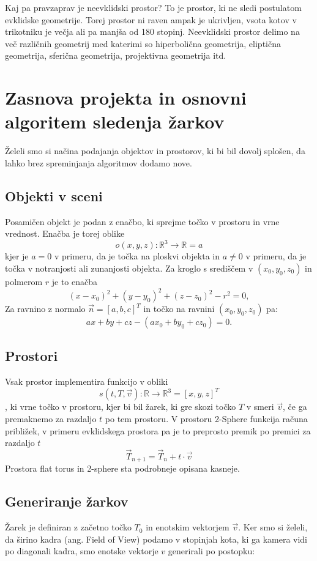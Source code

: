 \documentclass[titlepage]{article}
\begin{document}
Kaj pa pravzaprav je neevklidski prostor? To je prostor, ki ne sledi postulatom evklidske geometrije. 
Torej prostor ni raven ampak je ukrivljen, vsota kotov v trikotniku je večja ali pa manjša od 
180 stopinj. Neevklidski prostor delimo na več različnih geometrij med katerimi so 
hiperbolična geometrija, eliptična geometrija, sferična geometrija, projektivna geometrija itd.

\section{Zasnova projekta in osnovni algoritem sledenja žarkov}
Želeli smo si načina podajanja objektov in prostorov, ki bi bil dovolj splošen, da lahko brez
spreminjanja algoritmov dodamo nove.

\subsection{Objekti v sceni}
Posamičen objekt je podan z enačbo, ki sprejme točko v prostoru in vrne vrednost. 
Enačba je torej oblike
\[ o(x,y,z): \mathbb{R}^3 \to \mathbb{R} = a \]
kjer je \(a = 0\) v primeru, da je točka na ploskvi objekta in \( a \neq 0 \) v primeru, da 
je točka v notranjosti ali zunanjosti objekta.
Za kroglo s središčem v $(x_{0}, y_{0}, z_{0})$ in polmerom $r$ je to enačba
\[(x-x_{0})^{2}+(y-y_{0})^{2}+(z-z_{0})^{2}-r^{2}=0, \]
Za ravnino z normalo \( \vec{n} = [a, b, c]^T \) in točko na ravnini $(x_{0}, y_{0}, z_{0})$ pa:
\[ ax+by+cz-(ax_0+by_0+cz_0) = 0. \]

\subsection{Prostori}
Vsak prostor implementira funkcijo v obliki
\[ s(t, T, \vec{v}): \mathbb{R} \to \mathbb{R}^3 = [x, y, z]^T \],
ki vrne točko v prostoru, kjer bi bil žarek, ki gre skozi točko \(T\) v smeri \(\vec{v}\), če 
ga premaknemo za razdaljo \(t\) po tem prostoru. V prostoru 2-Sphere funkcija računa približek, v primeru evklidskega prostora pa je to 
preprosto premik po premici za razdaljo \(t\)
\[ \vec{T}_{n+1} = \vec{T}_{n} + t \cdot \vec{v} \]
\bigskip
Prostora flat torus in 2-sphere sta podrobneje opisana kasneje.

\subsection{Generiranje žarkov}
Žarek je definiran z začetno točko \(T_{0}\) in enotskim vektorjem \(\vec{v}\). Ker smo si želeli, da 
širino kadra (ang. Field of View) podamo v stopinjah kota, ki ga kamera vidi po diagonali kadra,
smo enotske vektorje \( v \) generirali po postopku:
\end{document}
